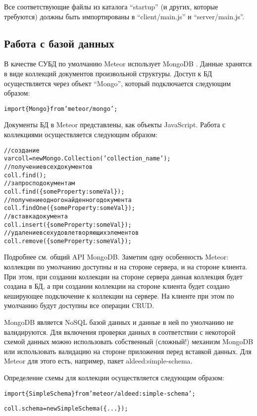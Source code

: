 \documentclass[a4paper,12pt]{article}
\begin{document}
Все соответствующие файлы из каталога ``startup'' (и
других, которые требуются) должны быть
импортированы в ``client/main.js'' и ``server/main.js''.

\subsection{Работа с базой данных}
В качестве СУБД по умолчанию Meteor использует MongoDB \cite{mongo}. 
Данные хранятся в виде коллекций документов произвольной структуры.
Доступ к БД осуществляется через объект ``Mongo'', который подключается
следующим образом:

\begin{alltt}
import \{ Mongo \} from 'meteor/mongo';
\end{alltt}

Документы БД в Meteor представлены, как объекты JavaScript.
Работа с коллекциями осуществляется следующим образом:

\begin{alltt}
// создание
var coll = new Mongo.Collection('collection\_name'); 
// получение всех документов
coll.find();
// запрос по документам
coll.find(\{someProperty: someVal\});
// получение одного найденного документа
coll.findOne(\{someProperty: someVal\});
// вставка документа
coll.insert(\{someProperty: someVal\});
// удаление всех удовлетворяющих элементов
coll.remove(\{someProperty: someVal\});
\end{alltt}

Подробнее см. общий API MongoDB. Заметим одну особенность Meteor:
коллекции по умолчанию доступны и на стороне сервера, и на стороне
клиента. При этом, при создании коллекции на стороне сервера
данная коллекция будет создана в БД, а при создании
коллекции на стороне клиента будет создано кеширующее подключение
к коллекции на сервере. На клиенте при этом по умолчанию будут
доступны все операции CRUD.

MongoDB является NoSQL базой данных и данные в ней по умолчанию
не валидируются. Для включения проверки данных в соответствии
с некоторой схемой данных можно использовать собственный (сложный!)
механизм MongoDB или использовать валидацию на стороне приложения
перед вставкой данных. Для Meteor для этого есть, например, пакет
aldeed:simple-schema.

Определение схемы для коллекции осуществляется следующим образом:
\begin{alltt}
	import \{ SimpleSchema \} from 'meteor/aldeed:simple-schema';
	
	coll.schema = new SimpleSchema(\{...\});
\end{alltt}
\end{document}
